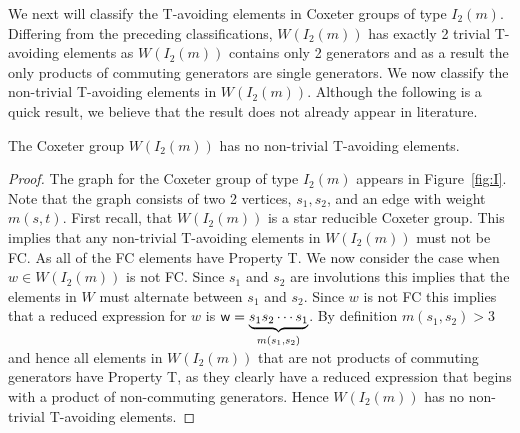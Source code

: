 We next will classify the T-avoiding elements in Coxeter groups of type $I_2(m)$. Differing from the preceding classifications, $W(I_2(m))$ has exactly 2 trivial T-avoiding elements as $W(I_2(m))$ contains only 2 generators and as a result the only products of commuting generators are single generators. We now classify the non-trivial T-avoiding elements in $W(I_2(m))$. Although the following is a quick result, we believe that the result does not already appear in literature.
\begin{theorem}
The Coxeter group $W(I_2(m))$ has no non-trivial T-avoiding elements.
\begin{proof}
	The graph for the Coxeter group of type $I_2(m)$ appears in Figure~\ref{fig:I}. Note that the graph consists of two 2 vertices, $s_1,s_2$, and an edge with weight $m(s,t)$. First recall, that $W(I_2(m))$ is a star reducible Coxeter group. This implies that any non-trivial T-avoiding elements in $W(I_2(m))$ must not be FC. As all of the FC elements have Property T. We now consider the case when $w \in W(I_2(m))$ is not FC. Since $s_1$ and $s_2$ are involutions this implies that the elements in $W$ must alternate between $s_1$ and $s_2$. Since $w$ is not FC this implies that a reduced expression for $w$ is $\mathsf{w}=\underbrace{s_1s_2 \cdots s_1}_{m(s_1,s_2)}$. By definition $m(s_1,s_2)>3$ and hence all elements in $W(I_2(m))$ that are not products of commuting generators have Property T, as they clearly have a reduced expression that begins with a product of non-commuting generators. Hence $W(I_2(m))$ has no non-trivial T-avoiding elements. 
\end{proof}	
\end{theorem}
 



